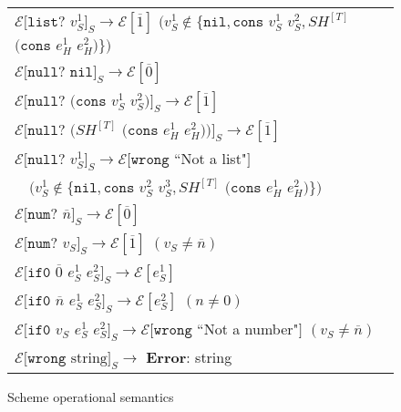 \begin{figure}[p]
\begin{tabular}{l}
$\mathscr{E}[\mathtt{list?}$ $v_{S}^{1}]_{S}\rightarrow\mathscr{E}[\overline{1}]$ $(v_{S}^{1}\not\in\lbrace\mathtt{nil},\mathtt{cons}$ $v_{S}^{1}$ $v_{S}^{2},SH^{[T]}$ $(\mathtt{cons}$ $e_{H}^{1}$ $e_{H}^{2})\rbrace)$ \\
$\mathscr{E}[\mathtt{null?}$ $\mathtt{nil}]_{S}\rightarrow\mathscr{E}[\overline{0}]$ \\
$\mathscr{E}[\mathtt{null?}$ $(\mathtt{cons}$ $v_{S}^{1}$ $v_{S}^{2})]_{S}\rightarrow\mathscr{E}[\overline{1}]$ \\
$\mathscr{E}[\mathtt{null?}$ $(SH^{[T]}$ $(\mathtt{cons}$ $e_{H}^{1}$ $e_{H}^{2}))]_{S}\rightarrow\mathscr{E}[\overline{1}]$ \\
$\mathscr{E}[\mathtt{null?}$ $v_{S}^{1}]_{S}\rightarrow\mathscr{E}[\mathtt{wrong}$ ``Not a list"$]$ \\
$\quad(v_{S}^{1}\not\in\lbrace\mathtt{nil},\mathtt{cons}$ $v_{S}^{2}$ $v_{S}^{3},SH^{[T]}$ $(\mathtt{cons}$ $e_{H}^{1}$ $e_{H}^{2})\rbrace)$ \\
$\mathscr{E}[\mathtt{num?}$ $\overline{n}]_{S}\rightarrow\mathscr{E}[\overline{0}]$ \\
$\mathscr{E}[\mathtt{num?}$ $v_{S}]_{S}\rightarrow\mathscr{E}[\overline{1}]$ $(v_{S}\neq\overline{n})$ \\
$\mathscr{E}[\mathtt{if0}$ $\overline{0}$ $e_{S}^{1}$ $e_{S}^{2}]_{S}\rightarrow\mathscr{E}[e_{S}^{1}]$ \\
$\mathscr{E}[\mathtt{if0}$ $\overline{n}$ $e_{S}^{1}$ $e_{S}^{2}]_{S}\rightarrow\mathscr{E}[e_{S}^{2}]$ $(n\neq 0)$ \\
$\mathscr{E}[\mathtt{if0}$ $v_{S}$ $e_{S}^{1}$ $e_{S}^{2}]_{S}\rightarrow\mathscr{E}[\mathtt{wrong}$ ``Not a number"$]$ $(v_{S}\neq\overline{n})$ \\
$\mathscr{E}[\mathtt{wrong}$ $\mathrm{string}]_{S}\rightarrow$ \textbf{Error}: string
\end{tabular}
\caption{Scheme operational semantics}
\label{sos}
\end{figure}